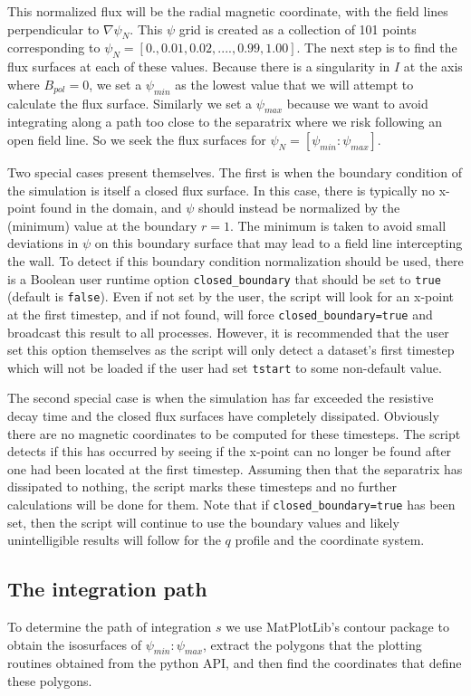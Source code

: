 \documentclass[12pt]{article}
\begin{document}
This normalized flux will be the radial magnetic coordinate, with the field lines perpendicular to $\nabla \psi_N$.
This $\psi$ grid is created as a collection of 101 points corresponding to $\psi_N = [0. , 0.01, 0.02 , ...., 0.99, 1.00]$.
The next step is to find the flux surfaces at each of these values.
Because there is a singularity in $I$ at the axis where $B_{pol} = 0$, we set a $\psi_{min}$ as the lowest value that we will attempt to calculate the flux surface.
Similarly we set a $\psi_{max}$ because we want to avoid integrating along a path too close to the separatrix where we risk following an open field line.
So we seek the flux surfaces for $\psi_N = [\psi_{min} : \psi_{max}]$.

Two special cases present themselves.
The first is when the boundary condition of the simulation is itself a closed flux surface.
In this case, there is typically no x-point found in the domain, and $\psi$ should instead be normalized by the (minimum) value at the boundary $r=1$.
The minimum is taken to avoid small deviations in $\psi$ on this boundary surface that may lead to a field line intercepting the wall.
To detect if this boundary condition normalization should be used, there is a Boolean user runtime option \texttt{closed\_boundary} that should be set to \texttt{true} (default is \texttt{false}).
Even if not set by the user, the script will look for an x-point at the first timestep, and if not found, will force \texttt{closed\_boundary=true} and broadcast this result to all processes.
However, it is recommended that the user set this option themselves as the script will only detect a dataset's first timestep which will not be loaded if the user had set \texttt{tstart} to some non-default value.

The second special case is when the simulation has far exceeded the resistive decay time and the closed flux surfaces have completely dissipated.
Obviously there are no magnetic coordinates to be computed for these timesteps.
The script detects if this has occurred by seeing if the x-point can no longer be found after one had been located at the first timestep.
Assuming then that the separatrix has dissipated to nothing, the script marks these timesteps and no further calculations will be done for them.
Note that if \texttt{closed\_boundary=true} has been set, then the script will continue to use the boundary values and likely unintelligible results will follow for the $q$ profile and the coordinate system.

\subsection{The integration path}
To determine the path of integration $s$ we use MatPlotLib's contour package to obtain the isosurfaces of $\psi_{min} : \psi_{max}$, extract the polygons that the plotting routines obtained from the python API, and then find the coordinates that define these polygons.
\end{document}
